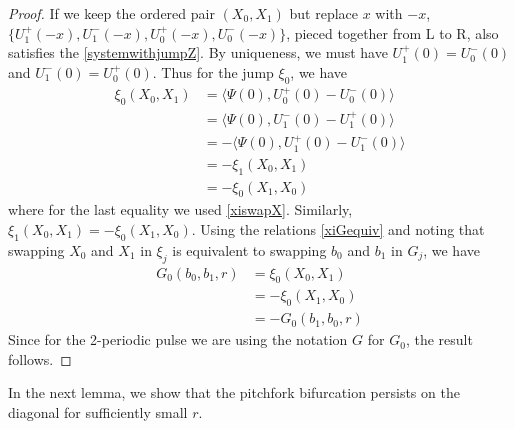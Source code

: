\documentclass[thesis.tex]{subfiles}
\begin{document}
\begin{lemma}
\begin{proof}
If we keep the ordered pair $(X_0, X_1)$ but replace $x$ with $-x$, $\{ U_1^+(-x), U_1^-(-x), U_0^+(-x), U_0^-(-x)\}$, pieced together from L to R, also satisfies the \eqref{systemwithjumpZ}. By uniqueness, we must have $U_1^+(0) = U_0^-(0)$ and $U_1^-(0) = U_0^+(0)$. Thus for the jump $\xi_0$, we have
\begin{align*}
\xi_0(X_0, X_1) &= \langle \Psi(0), U_0^+(0) - U_0^-(0) \rangle \\
&= \langle \Psi(0), U_1^-(0) - U_1^+(0) \rangle \\
&= -\langle \Psi(0), U_1^+(0) - U_1^-(0) \rangle \\
&= -\xi_1(X_0, X_1) \\
&= -\xi_0(X_1, X_0)
\end{align*}
where for the last equality we used \eqref{xiswapX}. Similarly, $\xi_1(X_0, X_1) = -\xi_0(X_1, X_0)$. Using the relations \eqref{xiGequiv} and noting that swapping $X_0$ and $X_1$ in $\xi_j$ is equivalent to swapping $b_0$ and $b_1$ in $G_j$, we have
\begin{align*}
G_0(b_0, b_1, r) &= \xi_0(X_0, X_1) \\
&= -\xi_0(X_1, X_0) \\
&= -G_0(b_1, b_0, r)
\end{align*}
Since for the 2-periodic pulse we are using the notation $G$ for $G_0$, the result follows.
\end{proof}
\end{lemma}

In the next lemma, we show that the pitchfork bifurcation persists on the diagonal for sufficiently small $r$.
\end{document}
